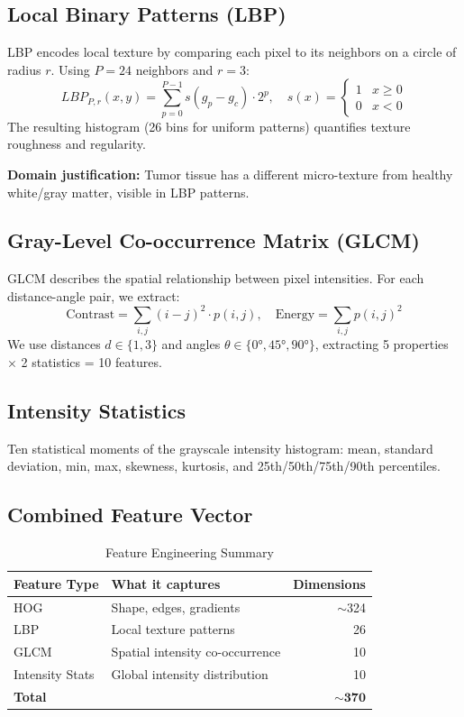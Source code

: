 \documentclass[12pt,a4paper]{article}
\begin{document}
\subsection{Local Binary Patterns (LBP)}

LBP \citep{ojala2002multiresolution} encodes local texture by comparing each pixel to its neighbors on a circle of radius $r$. Using $P=24$ neighbors and $r=3$:
\[
LBP_{P,r}(x,y) = \sum_{p=0}^{P-1} s(g_p - g_c) \cdot 2^p, \quad s(x) = \begin{cases} 1 & x \geq 0 \\ 0 & x < 0 \end{cases}
\]
The resulting histogram (26 bins for uniform patterns) quantifies texture roughness and regularity.

\textbf{Domain justification:} Tumor tissue has a different micro-texture from healthy white/gray matter, visible in LBP patterns.

\subsection{Gray-Level Co-occurrence Matrix (GLCM)}

GLCM \citep{haralick1973textural} describes the spatial relationship between pixel intensities. For each distance-angle pair, we extract:
\[
\text{Contrast} = \sum_{i,j} (i-j)^2 \cdot p(i,j), \quad
\text{Energy} = \sum_{i,j} p(i,j)^2
\]
We use distances $d \in \{1, 3\}$ and angles $\theta \in \{0°, 45°, 90°\}$, extracting 5 properties × 2 statistics = 10 features.

\subsection{Intensity Statistics}

Ten statistical moments of the grayscale intensity histogram: mean, standard deviation, min, max, skewness, kurtosis, and 25th/50th/75th/90th percentiles.

\subsection{Combined Feature Vector}

\begin{table}[H]
\centering
\caption{Feature Engineering Summary}
\begin{tabular}{@{}llr@{}}
\toprule
\textbf{Feature Type} & \textbf{What it captures} & \textbf{Dimensions} \\
\midrule
HOG & Shape, edges, gradients & $\sim$324 \\
LBP & Local texture patterns & 26 \\
GLCM & Spatial intensity co-occurrence & 10 \\
Intensity Stats & Global intensity distribution & 10 \\
\midrule
\textbf{Total} & & $\mathbf{\sim 370}$ \\
\bottomrule
\end{tabular}
\end{table}
\end{document}
